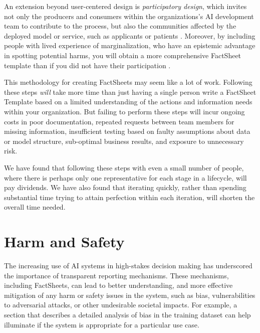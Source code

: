 \documentclass[11pt,dvipdfm]{article}
\begin{document}
An extension beyond user-centered design is \emph{participatory design}, which invites not only the producers and consumers within the organizations's AI development team to contribute to the process, but also the communities affected by the deployed model or service, such as applicants or patients \cite{lee2019we,prabhakaran2020}. Moreover, by including people with lived experience of marginalization, who have an epistemic advantage in spotting potential harms, you will obtain a more comprehensive FactSheet template than if you did not have their participation \cite{fazelpour2021}.

This methodology for creating FactSheets may seem like a lot of work. Following these steps \textit{will} take more time than just having a single person write a FactSheet Template based on a limited understanding of the actions and information needs within your organization. But failing to perform these steps will incur ongoing costs in poor documentation, repeated requests between team members for missing information, insufficient testing based on faulty assumptions about data or model structure, sub-optimal business results, and exposure to unnecessary risk.

We have found that following these steps with even a small number of people, where
there is perhaps only one representative for each stage in a lifecycle, will pay dividends. We have also found that
iterating quickly, rather than spending substantial time trying to attain perfection within each iteration, will shorten the overall time needed.

\section{Harm and Safety}
\label{sec-harm-safety}
The increasing use of AI systems in high-stakes decision making has
underscored the importance of transparent reporting mechanisms. These mechanisms, including FactSheets, can lead to better understanding, and more effective mitigation of any harm or safety issues in the system, such as bias, vulnerabilities to adversarial attacks, or other undesirable societal impacts. 
For example, a section that describes a detailed analysis of bias in the training dataset can help illuminate if the system is appropriate for a particular use case.

\end{document}
